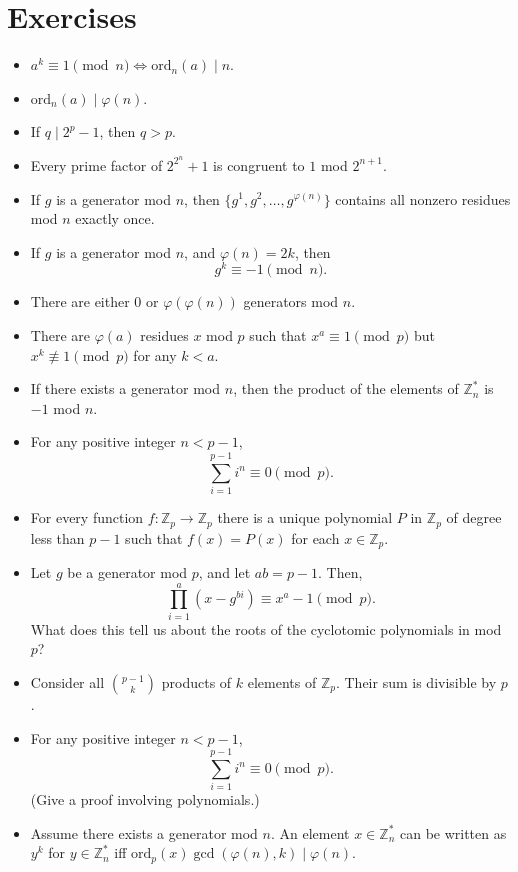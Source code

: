 \documentclass{article}
\newcommand\Zz{\mathbb{Z}}
\newcommand\ord{\mathrm{ord}}
\begin{document}
\section{Exercises}
\begin{itemize}
  \item $a^k\equiv 1\pmod n \iff \ord_n(a)\mid n$.
  \item $\ord_n(a)\mid\varphi(n)$.
  \item If $q\mid 2^p-1$, then $q>p$.
  \item Every prime factor of $2^{2^n}+1$ is congruent to $1$ mod $2^{n+1}$.
  \item If $g$ is a generator mod $n$, then $\{g^1,g^2,\ldots,g^{\varphi(n)}\}$
    contains all nonzero residues mod $n$ exactly once.
  \item If $g$ is a generator mod $n$, and $\varphi(n)=2k$, then
    \[g^k\equiv -1\pmod n.\]
  \item There are either $0$ or $\varphi(\varphi(n))$ generators mod $n$.
  \item There are $\varphi(a)$ residues $x$ mod $p$
    such that $x^a\equiv 1\pmod p$ but $x^k\not\equiv 1\pmod p$ for any $k<a$.
  \item If there exists a generator mod $n$, then the product of the elements of
    $\Zz_n^*$ is $-1$ mod $n$.
  \item For any positive integer $n<p-1$,
    \[\sum_{i=1}^{p-1} i^n\equiv 0\pmod p.\]
  \item For every function $f:\Zz_p\to\Zz_p$ there is a unique polynomial $P$ in
    $\Zz_p$ of degree less than $p-1$ such that $f(x)=P(x)$ for each
    $x\in\Zz_p$.
  \item Let $g$ be a generator mod $p$, and let $ab=p-1$. Then,
    \[\prod_{i=1}^a (x-g^{bi})\equiv x^a-1\pmod p.\]
    What does this tell us about the roots of the cyclotomic polynomials in mod
    $p$?
  \item Consider all $\binom{p-1}k$ products of $k$ elements of $\Zz_p$. Their
    sum is divisible by $p$.
  \item For any positive integer $n<p-1$, 
    \[\sum_{i=1}^{p-1} i^n\equiv 0\pmod p.\] (Give a proof involving
    polynomials.)
  \item Assume there exists a generator mod $n$.
    An element $x\in\Zz_n^*$ can be written as $y^k$ for $y\in\Zz_n^*$ iff
    $\ord_p(x)\gcd(\varphi(n),k)\mid \varphi(n)$.
\end{itemize}
\end{document}
